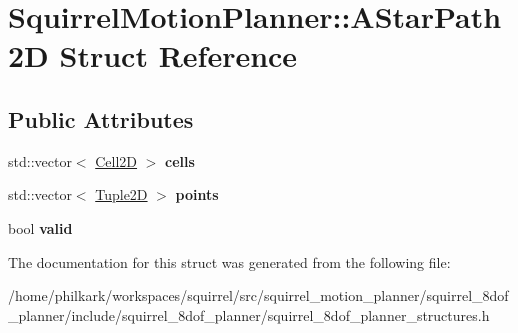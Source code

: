\hypertarget{structSquirrelMotionPlanner_1_1AStarPath2D}{\section{Squirrel\-Motion\-Planner\-:\-:A\-Star\-Path2\-D Struct Reference}
\label{structSquirrelMotionPlanner_1_1AStarPath2D}
}
\subsection*{Public Attributes}
\begin{DoxyCompactItemize}
\item 
\hypertarget{structSquirrelMotionPlanner_1_1AStarPath2D_a2f4e4b984a5f1116140c15ee393f3caa}{std\-::vector$<$ \hyperlink{structSquirrelMotionPlanner_1_1Cell2D}{Cell2\-D} $>$ {\bfseries cells}}\label{structSquirrelMotionPlanner_1_1AStarPath2D_a2f4e4b984a5f1116140c15ee393f3caa}

\item 
\hypertarget{structSquirrelMotionPlanner_1_1AStarPath2D_aaa58b6619166a22560e78387244f32c9}{std\-::vector$<$ \hyperlink{structSquirrelMotionPlanner_1_1Tuple2D}{Tuple2\-D} $>$ {\bfseries points}}\label{structSquirrelMotionPlanner_1_1AStarPath2D_aaa58b6619166a22560e78387244f32c9}

\item 
\hypertarget{structSquirrelMotionPlanner_1_1AStarPath2D_a2b4c53117ebc4843fd94658b541a1f65}{bool {\bfseries valid}}\label{structSquirrelMotionPlanner_1_1AStarPath2D_a2b4c53117ebc4843fd94658b541a1f65}

\end{DoxyCompactItemize}


The documentation for this struct was generated from the following file\-:\begin{DoxyCompactItemize}
\item 
/home/philkark/workspaces/squirrel/src/squirrel\-\_\-motion\-\_\-planner/squirrel\-\_\-8dof\-\_\-planner/include/squirrel\-\_\-8dof\-\_\-planner/squirrel\-\_\-8dof\-\_\-planner\-\_\-structures.\-h\end{DoxyCompactItemize}
